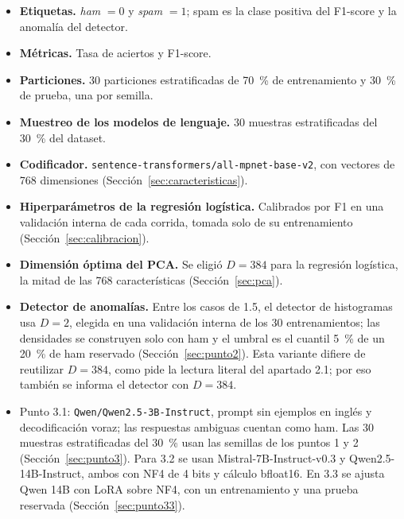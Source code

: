 \begin{itemize}
    \item \textbf{Etiquetas.} \emph{ham} $=0$ y \emph{spam} $=1$; spam es la
    clase positiva del F1-score y la anomalía del detector.
    \item \textbf{Métricas.} Tasa de aciertos y F1-score.
    \item \textbf{Particiones.} 30 particiones estratificadas de 70~\% de
    entrenamiento y 30~\% de prueba, una por semilla.
    \item \textbf{Muestreo de los modelos de lenguaje.} 30 muestras
    estratificadas del 30~\% del dataset.
    \item \textbf{Codificador.} \texttt{sentence-transformers/all-mpnet-base-v2},
    con vectores de 768 dimensiones (Sección~\ref{sec:caracteristicas}).
    \item \textbf{Hiperparámetros de la regresión logística.} Calibrados por
    F1 en una validación interna de cada corrida, tomada solo de su entrenamiento
    (Sección~\ref{sec:calibracion}).
    \item \textbf{Dimensión óptima del PCA.} Se eligió $D=384$ para la
    regresión logística, la mitad de las 768 características
    (Sección~\ref{sec:pca}).
    \item \textbf{Detector de anomalías.} Entre los casos de 1.5, el detector
    de histogramas usa $D=2$, elegida en una validación interna de los 30
    entrenamientos; las densidades se construyen solo con ham y el umbral es
    el cuantil 5~\% de un 20~\% de ham reservado (Sección~\ref{sec:punto2}).
    Esta variante difiere de reutilizar $D=384$, como pide la lectura literal
    del apartado 2.1; por eso también se informa el detector con $D=384$.
    \item Punto 3.1: \texttt{Qwen/Qwen2.5-3B-Instruct}, prompt sin ejemplos
    en inglés y decodificación voraz; las respuestas ambiguas cuentan como
    ham. Las 30 muestras estratificadas del 30~\% usan las semillas de los
    puntos 1 y 2 (Sección~\ref{sec:punto3}). Para 3.2 se usan
    Mistral-7B-Instruct-v0.3 y Qwen2.5-14B-Instruct, ambos con NF4 de 4 bits
    y cálculo bfloat16. En 3.3 se ajusta Qwen 14B con LoRA sobre NF4, con un
    entrenamiento y una prueba reservada (Sección~\ref{sec:punto33}).
\end{itemize}
